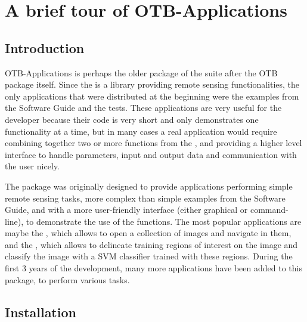 \chapter{A brief tour of OTB-Applications}\label{chap:otb-applications}

\section{Introduction}\label{sec:appintro}

OTB-Applications is perhaps the older package of the \otb
suite after the OTB package itself. Since the \otb is a
library providing remote sensing functionalities, the only
applications that were distributed at the beginning were the examples
from the Software Guide and the tests. These applications are very
useful for the developer because their code is very short and only
demonstrates one functionality at a time, but in many cases a real
application would require combining together two or more functions
from the \otb, and providing a higher level interface to
handle parameters, input and output data and communication with the
user nicely.

The \app package was originally designed to provide
applications performing simple remote sensing tasks, more complex than
simple examples from the Software Guide, and with a more user-friendly
interface (either graphical or command-line), to demonstrate the use
of the \otb functions. The most popular applications are
maybe the , which
allows to open a collection of images and navigate in them, and the
, which allows to
delineate training regions of interest on the image and classify the
image with a SVM classifier trained with these regions. During the
first 3 years of the \otb development, many more applications
have been added to this package, to perform various tasks.


\section{Installation}\label{sec:appinstall}
